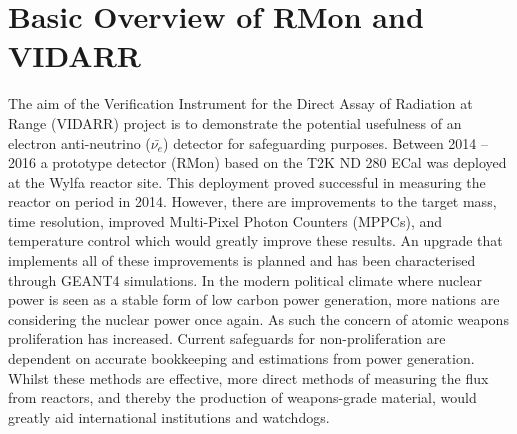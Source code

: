 \section{Basic Overview of RMon and VIDARR}
The aim of the Verification Instrument for the Direct Assay of Radiation at Range (VIDARR) project is to demonstrate the potential usefulness of an electron anti-neutrino ($\bar{\nu_e}$) detector for safeguarding purposes. Between 2014 -- 2016 a prototype detector (RMon) based on the T2K ND 280 ECal \cite{Allan_2013} was deployed at the Wylfa reactor site. This deployment proved successful in measuring the reactor on period in 2014. However, there are improvements to the target mass, time resolution, improved Multi-Pixel Photon Counters (MPPCs), and temperature control which would greatly improve these results. An upgrade that implements all of these improvements is planned and has been characterised through GEANT4 \cite{Agostinelli:2002hh} simulations. In the modern political climate where nuclear power is seen as a stable form of low carbon power generation, more nations are considering the nuclear power once again. As such the concern of atomic weapons proliferation has increased. Current safeguards for non-proliferation are dependent on accurate bookkeeping and estimations from power generation. Whilst these methods are effective, more direct methods of measuring the flux from reactors, and thereby the production of weapons-grade material, would greatly aid international institutions and watchdogs.

